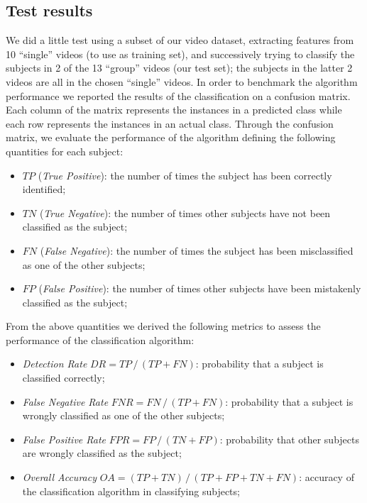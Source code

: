 \documentclass[letterpaper, 11pt, conference]{ieeeconf} %
\begin{document}
\subsection*{Test results}
We did a little test using a subset of our video dataset, extracting features from 10 ``single'' videos (to use as training set), and successively trying to classify the subjects in 2 of the 13 ``group'' videos (our test set); the subjects in the latter 2 videos are all in the chosen ``single'' videos.
In order to benchmark the algorithm performance we reported the results of the classification on a confusion matrix. Each column of the matrix represents the instances in a predicted class while each row represents the instances in an actual class. Through the confusion matrix, we evaluate the performance of the algorithm defining the following quantities for each subject:

\begin{itemize}
\item{$TP$ (\emph{True Positive}): the number of times the subject has been correctly identified;}
\item{$TN$ (\emph{True Negative}): the number of times other subjects have not been classified as the subject;}
\item{$FN$ (\emph{False Negative}): the number of times the subject has been misclassified as one of the other subjects;}
\item{$FP$ (\emph{False Positive}): the number of times other subjects have been mistakenly classified as the subject;}
\end{itemize}

From the above quantities we derived the following metrics to assess the performance of the classification algorithm:

\begin{itemize}
\item{\emph{Detection Rate} $DR=TP\,\slash\,(TP+FN)$: probability that a subject is classified correctly;}
\item{\emph{False Negative Rate} $FNR=FN\,\slash\,(TP+FN)$: probability that a subject is wrongly classified as one of the other subjects;}
\item{\emph{False Positive Rate} $FPR=FP\,\slash\,(TN+FP)$: probability that other subjects are wrongly classified as the subject;}
\item{\emph{Overall Accuracy} $OA=(TP+TN)\,\slash\,(TP+FP+TN+FN)$: accuracy of the classification algorithm in classifying subjects;}
\end{itemize}
\end{document}

